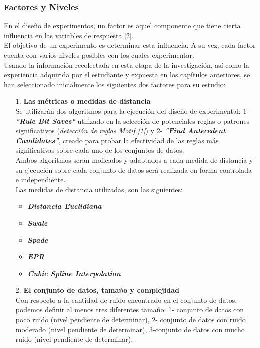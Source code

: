 \subsubsection{Factores y Niveles}
En el dise\~no de experimentos, un factor es aquel componente que tiene cierta
influencia en las variables de respuesta [2].\\
El objetivo de un experimento es determinar esta influencia. A su vez, cada factor cuenta con varios niveles posibles con los cuales experimentar.\\
Usando la informaci\'on recolectada en esta etapa de la investigaci\'on, as\'i como la experiencia adquirida por el estudiante y expuesta en los cap\'itulos anteriores, se han seleccionado inicialmente los siguientes dos factores para su estudio:
\begin{itemize}
\item [1.] \textbf{Las m\'etricas o medidas de distancia}\\
Se utilizar\'an dos algoritmos para la ejecuci\'on del dise\~no de experimental: 1- \textit{\textbf{"Rule Bit Saves"}} utilizado en la selecci\'on de potenciales reglas o patrones significativos (\textit{\textit{detecci\'on de reglas \textit{Motif [1]}}}) y 2- \textit{\textbf{"Find Antecedent Candidates"}}, creado para probar la efectividad de las reglas m\'as significativas sobre cada uno de los conjuntos de datos.\\
Ambos algoritmos ser\'an moficados y adaptados a cada medida de distancia y su ejecuci\'on sobre cada conjunto de datos ser\'a realizada en forma controlada e independiente.\\
Las medidas de distancia utilizadas, son las siguientes:
\begin{itemize}
\item \textbf{\textit{Distancia Euclidiana}}
\item \textbf{\textit{Swale}}
\item \textbf{\textit{Spade}}
\item \textbf{\textit{EPR}}
\item \textbf{\textit{Cubic Spline Interpolation}}
\end{itemize}
\item [2.] \textbf{El conjunto de datos, tama\~no y complejidad}\\
Con respecto a la cantidad de ruido encontrado en el conjunto de datos, podemos definir al menos tres diferentes tama\~no: 1- conjunto de datos con poco ruido (nivel pendiente de determinar), 2- conjunto de datos con ruido moderado (nivel pendiente de determinar), 3-conjunto de datos con mucho ruido (nivel pendiente de determinar). \\

\end{itemize}
